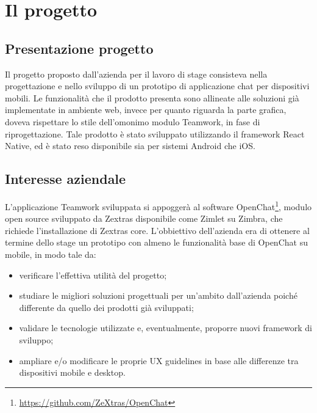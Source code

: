 
\chapter{Il progetto}\label{chap:project}
\section{Presentazione progetto}
Il progetto proposto dall'azienda per il lavoro di stage consisteva nella progettazione e nello sviluppo di un prototipo di applicazione chat per dispositivi mobili. Le funzionalità che il prodotto presenta sono allineate alle soluzioni già implementate in ambiente web, invece per quanto riguarda la parte grafica, doveva rispettare lo stile dell'omonimo modulo Teamwork, in fase di riprogettazione. Tale prodotto è stato sviluppato utilizzando il framework React Native, ed è stato reso disponibile sia per sistemi Android che iOS.

\section{Interesse aziendale}
L'applicazione Teamwork sviluppata si appoggerà al software OpenChat\footnote{\url{https://github.com/ZeXtras/OpenChat}}, modulo open source sviluppato da Zextras disponibile come Zimlet su Zimbra, che richiede l'installazione di Zextras core.
L'obbiettivo dell'azienda era di ottenere al termine dello stage un prototipo con almeno le funzionalità base di OpenChat su mobile, in modo tale da:
\begin{itemize}
	\item verificare l'effettiva utilità del progetto;
	\item studiare le migliori soluzioni progettuali per un'ambito  dall'azienda poiché differente da quello dei prodotti già sviluppati;
	\item validare le tecnologie utilizzate e, eventualmente, proporre nuovi framework di sviluppo;
	\item ampliare e/o modificare le proprie UX guidelines in base alle differenze tra dispositivi mobile e desktop.
\end{itemize}


